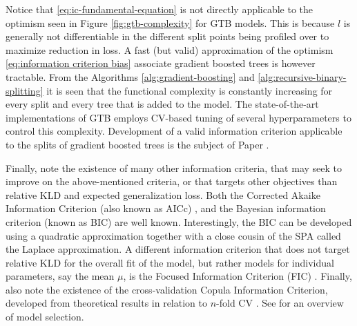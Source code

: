 Notice that \eqref{eq:ic-fundamental-equation} is not directly applicable to the optimism
seen in Figure \ref{fig:gtb-complexity} for GTB models.
This is because $l$ is generally not differentiable in the different split points being profiled over to maximize reduction in loss.
A fast (but valid) approximation of the optimism \eqref{eq:information criterion bias} associate 
gradient boosted trees is however tractable. 
From the Algorithms \ref{alg:gradient-boosting} and \ref{alg:recursive-binary-splitting} it is 
seen that the functional complexity is constantly increasing for every split and every tree that 
is added to the model.
The state-of-the-art implementations of GTB employs CV-based tuning of several hyperparameters to 
control this complexity.
Development of a valid information criterion applicable to the splits of gradient boosted trees
is the subject of Paper .

Finally, note the existence of many other information criteria, that may seek to improve on the above-mentioned criteria, or that targets other objectives than relative KLD and expected generalization loss. Both the Corrected Akaike Information Criterion (also known as AICc) \citep{sugiura1978further}, and the Bayesian information criterion (known as BIC) \citep{schwarz1978estimating} are well known.
Interestingly, the BIC can be developed using a quadratic approximation together with a close cousin of the SPA called the Laplace approximation.
A different information criterion that does not target relative KLD for the overall fit of the model, but rather models for individual parameters, say the mean $\mu$, is the Focused Information Criterion (FIC) \citep{claeskens2003focused}.
Finally, also note the existence of the cross-validation Copula Information Criterion, developed from theoretical results in relation to $n$-fold CV \citep{gronneberg2014copula}.
See \citet{claeskens2008model} for an overview of model selection. 
